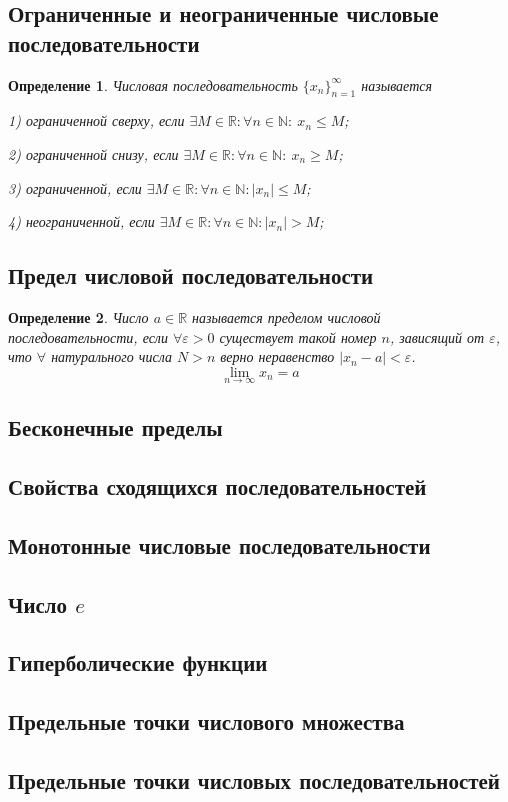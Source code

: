 \documentclass[a4paper,12pt]{article} %
\newtheorem{definition}{Определение}
\begin{document}
\subsection{Ограниченные и неограниченные числовые последовательности}

\begin{definition}
	Числовая последовательность $\{x_n\}_{n=1}^\infty$ называется 

1) ограниченной сверху, если $\exists M\in \mathbb{R}: \forall n\in \mathbb{N}: \ x_n\le M$;

2) ограниченной снизу, если \space $\exists M\in \mathbb{R}: \forall n\in \mathbb{N}: \ x_n\ge M$;

3) ограниченной, если \space\space\space\space\space\space\space\space\space $\exists M\in \mathbb{R}: \forall n\in \mathbb{N}:|x_n| \le M$;

4) неограниченной, если \space\space\space\space\space\space $\exists M\in \mathbb{R}: \forall n\in \mathbb{N}:|x_n|> M$;
\end{definition}

\subsection{Предел числовой последовательности}
\begin{definition}
	Число $a\in\mathbb{R}$ называется пределом числовой последовательности, если $\forall \varepsilon>0$ существует такой номер $n$, зависящий от $\varepsilon$, что $\forall$ натурального числа $N>n$ верно неравенство $|x_n - a| < \varepsilon$.
	$$\lim_{n\to\infty} x_n = a$$
\end{definition}

\subsection{Бесконечные пределы}
\subsection{Свойства сходящихся последовательностей}
\subsection{Монотонные числовые последовательности}
\subsection{Число $e$}
\subsection{Гиперболические функции}
\subsection{Предельные точки числового множества}
\subsection{Предельные точки числовых последовательностей}
\end{document}
